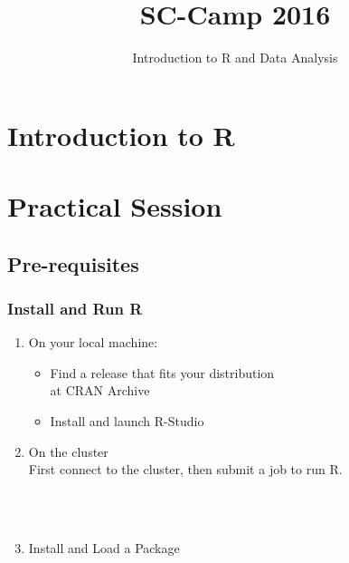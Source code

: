 \documentclass{beamer}
\title{SC-Camp 2016}
\subtitle{Introduction to R and Data Analysis}
\author{\authors}
\institute[UL]{
  University of Luxembourg, Luxembourg
}
\date{}
\begin{document}
\begin{frame}
    \vspace{2.5em}
    \titlepage
\end{frame}



\section{Introduction to R}






\section{Practical Session}
\subsection{Pre-requisites}

\begin{frame}[fragile]
    \frametitle{Install and Run R}
    \begin{enumerate}
      \item On your local machine:
		\begin{itemize}
			\item Find a release that fits your distribution\\ at CRAN Archive\hfill{}
			\item Install and launch R-Studio\hfill{}
		\end{itemize}
      \item On the cluster\\
       First connect to the cluster, then submit a job to run R.
        \begin{cmdline}
            \\
            \\
        \end{cmdline}
        \item Install and Load a Package
            \begin{cmdline}
              \\
              \\
            \end{cmdline}
    \end{enumerate}
\end{frame}
\end{document}
